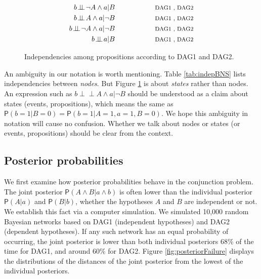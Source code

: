 \documentclass[
  10pt,
  dvipsnames,enabledeprecatedfontcommands]{scrartcl}
\newcommand{\indep}{\!\perp \!\!\! \perp\!}
\newcommand{\n}{\neg}
\newcommand{\et}{\wedge}
\newcommand{\pr}[1]{\ensuremath{\mathsf{P}(#1)}}
\begin{document}
\begin{figure}
\begin{subfigure}[!ht]{0.5\textwidth}
\begin{align}
b\indep \n A \et a \vert B \label{eq:I5a} &\hspace{2cm}\mbox{\footnotesize DAG1 , DAG2}  \\
b\indep A \et a \vert \n B \label{eq:I5b} & \hspace{2cm}\mbox{\footnotesize DAG1 , DAG2} \\
b\indep \n A \et a \vert \n B \label{eq:I5c} & \hspace{2cm}\mbox{\footnotesize DAG1 , DAG2} \\
b \indep a \vert B \label{eq:I6} & \hspace{2cm}\mbox{\footnotesize DAG1 , DAG2} 
\end{align}
\end{subfigure}
\caption{Independencies among propositions according to \textsf{DAG1} and \textsf{DAG2}.} 
\label{tab:indepBNS-states}
\end{figure}

\noindent An ambiguity in our notation is worth mentioning. Table
\ref{tab:indepBNS} lists independencies between \emph{nodes}. But Figure
\ref{tab:indepBNS-states} is about \textit{states} rather than nodes. An
expression such as \mbox{$b\indep A \et a \vert \n B$} should be
understood as a claim about states (events, propositions), which means
the same as
\(\pr{b = 1 \vert B = 0} = \pr{b = 1 \vert A = 1, a = 1, B = 0}\). We
hope this ambiguity in notation will cause no confusion. Whether we talk
about nodes or states (or events, propositions) should be clear from the
context.

\hypertarget{posterior-probabilities}{%
\subsection*{Posterior probabilities}\label{posterior-probabilities}}

We first examine how posterior probabilities behave in the conjunction
problem. The joint posterior \(\pr{A\wedge B \vert a\wedge b}\) is often
lower than the individual posterior \(\pr{A \vert a}\) and
\(\pr{B \vert b}\), whether the hypotheses \(A\) and \(B\) are
independent or not. We establish this fact via a computer simulation. We
simulated 10,000 random Bayesian networks based on \textsf{DAG1}
(independent hypotheses) and \textsf{DAG2} (dependent hypotheses). If
any such network has an equal probability of occurring, the joint
posterior is lower than both individual posteriors 68\% of the time for
\textsf{DAG1}, and around 60\% for \textsf{DAG2}. Figure
\ref{fig:posteriorFailure} displays the distributions of the distances
of the joint posterior from the lowest of the individual posteriors.
\end{document}
